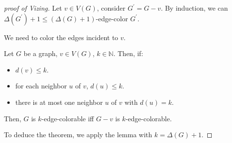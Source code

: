 \begin{proof}[proof of Vizing]
    Let \(v \in V(G)\), consider \(G^{\prime} = G - v\). By induction, we can \(\Delta (G^{\prime} ) + 1 \le (\Delta (G) + 1)\)-edge-color \(G^{\prime}\). 
    
    We need to color the edges incident to \(v\).      

    \begin{lemma}
        Let \(G\) be a graph, \(v \in V(G)\), \(k \in \mathbb{N}\). Then, if:
        \begin{itemize}
            \item \(d(v) \le k\). 
            \item for each neighbor \(u\) of \(v\), \(d(u) \le k\). 
            \item there is at most one neighbor \(u\) of \(v\) with \(d(u) = k\).       
        \end{itemize}   
        Then, \(G\) is \(k\)-edge-colorable iff \(G - v\) is \(k\)-edge-colorable.    
    \end{lemma}

    To deduce the theorem, we apply the lemma with \(k = \Delta (G) + 1\).  
\end{proof}